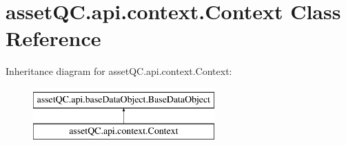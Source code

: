 \hypertarget{classassetQC_1_1api_1_1context_1_1Context}{\section{asset\-Q\-C.\-api.\-context.\-Context \-Class \-Reference}
\label{d1/d82/classassetQC_1_1api_1_1context_1_1Context}
}
\-Inheritance diagram for asset\-Q\-C.\-api.\-context.\-Context\-:\begin{figure}[H]
\begin{center}
\leavevmode
\includegraphics[height=2.000000cm]{d1/d82/classassetQC_1_1api_1_1context_1_1Context}
\end{center}
\end{figure}
